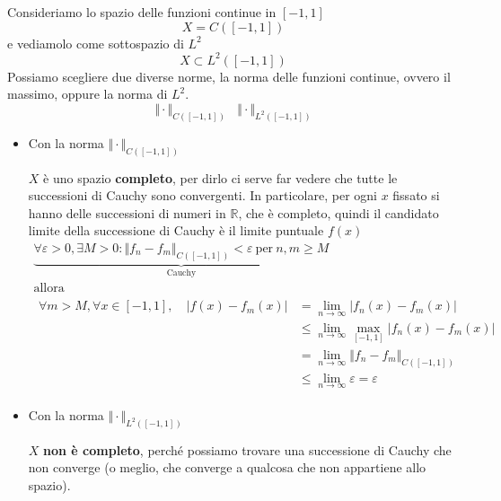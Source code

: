 \documentclass[10pt,a4paper,twoside,openright]{book}
\begin{document}
Consideriamo lo spazio delle funzioni continue in $\displaystyle [ -1,1]$
\begin{equation*}
	X=C([ -1,1])
\end{equation*}
e vediamolo come sottospazio di $\displaystyle L^{2}$
\begin{equation*}
	X\subset L^{2}([ -1,1])
\end{equation*}
Possiamo scegliere due diverse norme, la norma delle funzioni continue, ovvero il massimo, oppure la norma di $\displaystyle L^{2}$.
\begin{equation*}
	\Vert \cdotp \Vert _{C([ -1,1])} \ \ \ \ \Vert \cdotp \Vert _{L^{2}([ -1,1])}
\end{equation*}
\begin{itemize}
\item Con la norma $\displaystyle \Vert \cdotp \Vert _{C([ -1,1])}$

$\displaystyle X$ è uno spazio \textbf{completo}, per dirlo ci serve far vedere che tutte le successioni di Cauchy sono convergenti. In particolare, per ogni $\displaystyle x$ fissato si hanno delle successioni di numeri in $\displaystyle \mathbb{R}$, che è completo, quindi il candidato limite della successione di Cauchy è il limite puntuale $\displaystyle f( x)$
\begin{gather*}
	\underbrace{\forall \varepsilon  >0,\exists M >0:\Vert f_{n} -f_{m}\Vert _{C([ -1,1])} < \varepsilon \ \text{per} \ n,m\geqslant M}_{\text{Cauchy}}\\
	\text{allora}\\
	\begin{aligned}
		\forall m >M,\forall x\in [ -1,1],\quad |f( x) -f_{m}( x) | & =\lim _{n\rightarrow \infty } |f_{n}( x) -f_{m}( x) |\\
			 & \leqslant \lim _{n\rightarrow \infty }\max_{[ -1,1]} |f_{n}( x) -f_{m}( x) |\\
			 & =\lim _{n\rightarrow \infty }\Vert f_{n} -f_{m}\Vert _{C([ -1,1])}\\
			 & \leqslant \lim _{n\rightarrow \infty } \varepsilon =\varepsilon 
	\end{aligned}
\end{gather*}
\item Con la norma $\displaystyle \Vert \cdotp \Vert _{L^{2}([ -1,1])}$

$\displaystyle X$ \textbf{non è completo}, perché possiamo trovare una successione di Cauchy che non converge (o meglio, che converge a qualcosa che non appartiene allo spazio).


\end{itemize}
\end{document}

